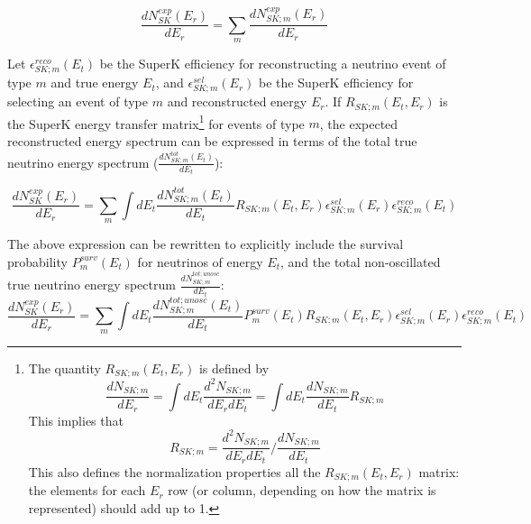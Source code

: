 \begin{equation}
\displaystyle
  \frac{dN_{SK}^{exp}(E_{r})}{dE_{r}} =
     \sum_{m} \frac{dN_{SK;m}^{exp}(E_{r})}{dE_{r}} 
\end{equation}

Let 
$\epsilon^{reco}_{SK;m}(E_{t})$
be the SuperK efficiency for reconstructing a neutrino event of type $m$ and true energy $E_{t}$, 
and 
$\epsilon^{sel}_{SK;m}(E_{r})$ be the SuperK efficiency for selecting an event of type $m$
and reconstructed energy $E_{r}$.
If $R_{SK;m}(E_{t},E_{r})$ is the SuperK energy transfer matrix\footnote{
The quantity $R_{SK;m}(E_{t},E_{r})$ is defined by
\begin{equation}
\displaystyle
   \frac{dN_{SK;m}}{dE_{r}}
 = \int { dE_{t} \frac{d^{2}N_{SK;m}}{dE_{r}dE_{t}} }
 = \int { dE_{t} \frac{dN_{SK;m}}{dE_{t}} R_{SK;m} }
\end{equation}
This implies that
\begin{equation}
\displaystyle
    R_{SK;m} 
 = \frac{d^{2}N_{SK;m}}{dE_{r}dE_{t}} / 
    \frac{dN_{SK;m}}{dE_{t}}
\end{equation}
This also defines the normalization properties all the $R_{SK;m}(E_{t},E_{r})$ matrix:
the elements for each $E_{r}$ row (or column, depending on how the matrix is represented) should add up to 1.
}
for events of type $m$, the expected reconstructed energy spectrum can be expressed in terms of the
total true neutrino energy spectrum
($\frac{dN_{SK;m}^{tot}(E_{t})}{dE_{t}}$):

\begin{equation}
\displaystyle
  \frac{dN_{SK}^{exp}(E_{r})}{dE_{r}} 
  = \sum_{m} \int dE_{t} 
    \frac{dN_{SK;m}^{tot}(E_{t})}{dE_{t}} 
    R_{SK;m}(E_{t},E_{r}) 
    \epsilon^{sel}_{SK;m}(E_{r}) 
    \epsilon^{reco}_{SK;m}(E_{t})
\end{equation}

The above expression can be rewritten to explicitly include
the survival probability $P_{m}^{surv}(E_{t})$ for neutrinos of energy $E_{t}$,
and the total non-oscillated true neutrino energy spectrum $\frac{dN_{SK;m}^{tot;unosc}}{dE_{t}}$:
\begin{equation}
\displaystyle
  \frac{dN_{SK}^{exp}(E_{r})}{dE_{r}} 
  = \sum_{m} \int dE_{t} 
    \frac{\displaystyle dN_{SK;m}^{tot;unosc}(E_{t})}
         {\displaystyle dE_{t}} 
    P_{m}^{surv}(E_{t}) 
    R_{SK;m}(E_{t},E_{r}) 
    \epsilon^{sel}_{SK;m}(E_{r}) 
    \epsilon^{reco}_{SK;m}(E_{t})
\end{equation}

